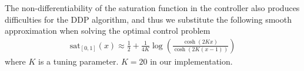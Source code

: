 \documentclass[journal ]{new-aiaa}
\begin{document}
The non-differentiability of the saturation function in the controller also produces difficulties for the DDP algorithm, and thus we substitute the following smooth approximation when solving the optimal control problem
\begin{align*}
\mathrm{sat}_{[0,1]}(x) \approx \frac{1}{2} + \frac{1}{4K}\log\left(\frac{\cosh (2Kx)}{\cosh (2K(x-1))}\right) 
\end{align*}
where $K$ is a tuning parameter. $K=20$ in our implementation.

%
%
\end{document}
